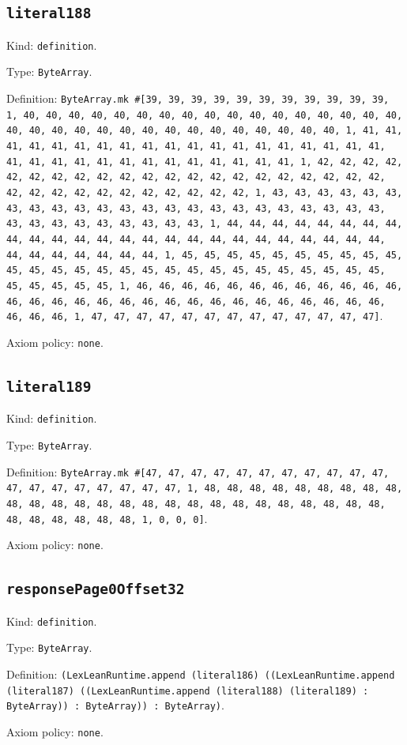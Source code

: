 \documentclass[11pt]{article}
\begin{document}
\subsection*{\texttt{literal188}}
\noindent Kind: \texttt{definition}.\par
\noindent Type: \texttt{ByteArray}.\par
\noindent Definition: \texttt{ByteArray.mk \#[39, 39, 39, 39, 39, 39, 39, 39, 39, 39, 39, 1, 40, 40, 40, 40, 40, 40, 40, 40, 40, 40, 40, 40, 40, 40, 40, 40, 40, 40, 40, 40, 40, 40, 40, 40, 40, 40, 40, 40, 40, 40, 40, 40, 1, 41, 41, 41, 41, 41, 41, 41, 41, 41, 41, 41, 41, 41, 41, 41, 41, 41, 41, 41, 41, 41, 41, 41, 41, 41, 41, 41, 41, 41, 41, 41, 41, 1, 42, 42, 42, 42, 42, 42, 42, 42, 42, 42, 42, 42, 42, 42, 42, 42, 42, 42, 42, 42, 42, 42, 42, 42, 42, 42, 42, 42, 42, 42, 42, 42, 1, 43, 43, 43, 43, 43, 43, 43, 43, 43, 43, 43, 43, 43, 43, 43, 43, 43, 43, 43, 43, 43, 43, 43, 43, 43, 43, 43, 43, 43, 43, 43, 43, 1, 44, 44, 44, 44, 44, 44, 44, 44, 44, 44, 44, 44, 44, 44, 44, 44, 44, 44, 44, 44, 44, 44, 44, 44, 44, 44, 44, 44, 44, 44, 44, 44, 1, 45, 45, 45, 45, 45, 45, 45, 45, 45, 45, 45, 45, 45, 45, 45, 45, 45, 45, 45, 45, 45, 45, 45, 45, 45, 45, 45, 45, 45, 45, 45, 45, 1, 46, 46, 46, 46, 46, 46, 46, 46, 46, 46, 46, 46, 46, 46, 46, 46, 46, 46, 46, 46, 46, 46, 46, 46, 46, 46, 46, 46, 46, 46, 46, 46, 1, 47, 47, 47, 47, 47, 47, 47, 47, 47, 47, 47, 47, 47]}.\par
\noindent Axiom policy: \texttt{none}.\par
\subsection*{\texttt{literal189}}
\noindent Kind: \texttt{definition}.\par
\noindent Type: \texttt{ByteArray}.\par
\noindent Definition: \texttt{ByteArray.mk \#[47, 47, 47, 47, 47, 47, 47, 47, 47, 47, 47, 47, 47, 47, 47, 47, 47, 47, 47, 1, 48, 48, 48, 48, 48, 48, 48, 48, 48, 48, 48, 48, 48, 48, 48, 48, 48, 48, 48, 48, 48, 48, 48, 48, 48, 48, 48, 48, 48, 48, 48, 48, 1, 0, 0, 0]}.\par
\noindent Axiom policy: \texttt{none}.\par
\subsection*{\texttt{responsePage0Offset32}}
\noindent Kind: \texttt{definition}.\par
\noindent Type: \texttt{ByteArray}.\par
\noindent Definition: \texttt{(LexLeanRuntime.append (literal186) ((LexLeanRuntime.append (literal187) ((LexLeanRuntime.append (literal188) (literal189) : ByteArray)) : ByteArray)) : ByteArray)}.\par
\noindent Axiom policy: \texttt{none}.\par
\end{document}
